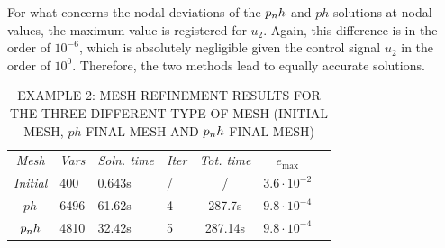 For what concerns the nodal deviations of the $p_{n}h$ and $ph$ solutions at nodal values, the maximum value is registered for $u_2$. Again, this difference is in the order of $10^{-6}$, which is absolutely negligible given the control signal $u_2$ in the order of $10^0$. Therefore, the two methods lead to equally accurate solutions.
\begin{table}[t]
	\caption{EXAMPLE 2: MESH REFINEMENT RESULTS FOR THE THREE DIFFERENT TYPE OF MESH (INITIAL MESH, $ph$ FINAL MESH AND $p_{n}h$ FINAL MESH)}
	\begin{center}
		\label{tab:tabledisk}
		\begin{tabular}{c l l l c c c}
			& & \\ %
			\hline
			\emph{Mesh} & \emph{Vars} & \emph{Soln. time} & \emph{Iter} & \emph{Tot. time} & $e_\text{max}$ \\
			\hline
			\emph{Initial} & 400 & 0.643s & / & / &  $3.6\cdot 10^{-2}$\\
			$ph$  & 6496 & 61.62s & 4 & 287.7s & $9.8\cdot 10^{-4}$ \\
			$p_{n}h$ & 4810 & 32.42s & 5 & 287.14s & $9.8\cdot 10^{-4}$ \\
			\hline
		\end{tabular}
	\end{center}
\end{table}
